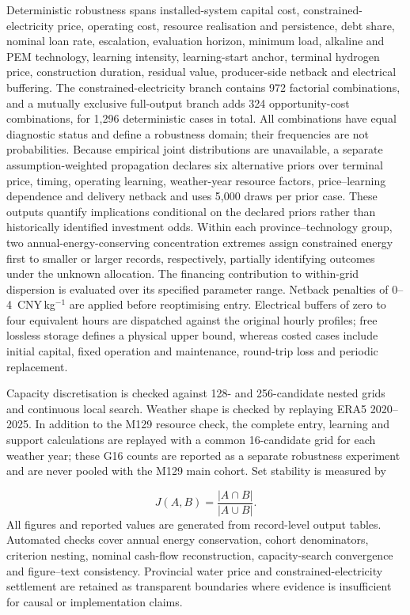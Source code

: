 \documentclass[pdflatex,sn-nature]{sn-jnl}
\newcommand{\cnykg}{CNY\,kg$^{-1}$}
\begin{document}
Deterministic robustness spans installed-system capital cost, constrained-electricity price, operating cost, resource realisation and persistence, debt share, nominal loan rate, escalation, evaluation horizon, minimum load, alkaline and PEM technology, learning intensity, learning-start anchor, terminal hydrogen price, construction duration, residual value, producer-side netback and electrical buffering. The constrained-electricity branch contains 972 factorial combinations, and a mutually exclusive full-output branch adds 324 opportunity-cost combinations, for 1,296 deterministic cases in total. All combinations have equal diagnostic status and define a robustness domain; their frequencies are not probabilities. Because empirical joint distributions are unavailable, a separate assumption-weighted propagation declares six alternative priors over terminal price, timing, operating learning, weather-year resource factors, price--learning dependence and delivery netback and uses 5,000 draws per prior case. These outputs quantify implications conditional on the declared priors rather than historically identified investment odds. Within each province--technology group, two annual-energy-conserving concentration extremes assign constrained energy first to smaller or larger records, respectively, partially identifying outcomes under the unknown allocation. The financing contribution to within-grid dispersion is evaluated over its specified parameter range. Netback penalties of 0--4~\cnykg{} are applied before reoptimising entry. Electrical buffers of zero to four equivalent hours are dispatched against the original hourly profiles; free lossless storage defines a physical upper bound, whereas costed cases include initial capital, fixed operation and maintenance, round-trip loss and periodic replacement.

Capacity discretisation is checked against 128- and 256-candidate nested grids and continuous local search. Weather shape is checked by replaying ERA5 2020--2025. In addition to the M129 resource check, the complete entry, learning and support calculations are replayed with a common 16-candidate grid for each weather year; these G16 counts are reported as a separate robustness experiment and are never pooled with the M129 main cohort. Set stability is measured by

\begin{equation}
J(A,B)=\frac{|A\cap B|}{|A\cup B|}.
\label{eq:jaccard}
\end{equation}
All figures and reported values are generated from record-level output tables. Automated checks cover annual energy conservation, cohort denominators, criterion nesting, nominal cash-flow reconstruction, capacity-search convergence and figure--text consistency. Provincial water price and constrained-electricity settlement are retained as transparent boundaries where evidence is insufficient for causal or implementation claims.
\end{document}
